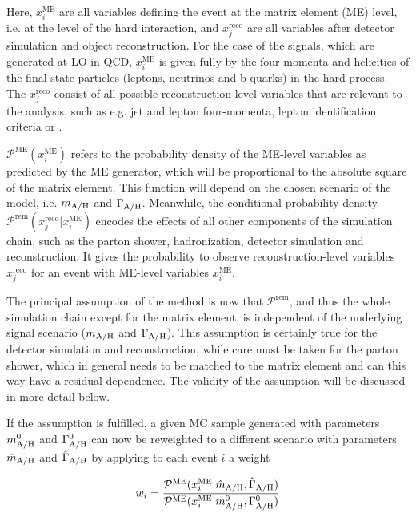 Here, $x_i^{\mathrm{ME}}$ are all variables defining the event at the matrix element (ME) level, i.e. at the level of the hard interaction, and $x_j^{\mathrm{reco}}$ are all variables after detector simulation and object reconstruction. For the case of the \AH signals, which are generated at LO in QCD, $x_i^{\mathrm{ME}}$ is given fully by the four-momenta and helicities of the final-state particles (leptons, neutrinos and b quarks) in the hard process. The $x_j^{\mathrm{reco}}$ consist of all possible reconstruction-level variables that are relevant to the analysis, such as e.g. jet and lepton four-momenta, lepton identification criteria or \ptmissvec. 

$\mathcal{P}^{\mathrm{ME}} (x_i^{\mathrm{ME}})$ refers to the probability density of the ME-level variables as predicted by the ME generator, which will be proportional to the absolute square of the matrix element. This function will depend on the chosen scenario of the \AH model, i.e. $m_{\mathrm{A/H}}$ and $\Gamma_{\mathrm{A/H}}$. Meanwhile, the conditional probability density $\mathcal{P}^{\mathrm{rem}} (x_j^{\mathrm{reco}} | x_i^{\mathrm{ME}})$ encodes the effects of all other components of the simulation chain, such as the parton shower, hadronization, detector simulation and reconstruction. It gives the probability to observe reconstruction-level variables $x_j^{\mathrm{reco}}$ for an event with ME-level variables $x_i^{\mathrm{ME}}$.

The principal assumption of the method is now that $\mathcal{P}^{\mathrm{rem}}$, and thus the whole simulation chain except for the matrix element, is independent of the underlying \AH signal scenario ($m_{\mathrm{A/H}}$ and $\Gamma_{\mathrm{A/H}}$). This assumption is certainly true for the detector simulation and reconstruction, while care must be taken for the parton shower, which in general needs to be matched to the matrix element and can this way have a residual dependence. The validity of the assumption will be discussed in more detail below.

If the assumption is fulfilled, a given \AH MC sample generated with parameters $m_{\mathrm{A/H}}^0$ and $\Gamma_{\mathrm{A/H}}^0$ can now be reweighted to a different \AH scenario with parameters $\hat{m}_{\mathrm{A/H}}$ and $\hat{\Gamma}_{\mathrm{A/H}}$ by applying to each event $i$ a weight 

\begin{equation}
\label{eq:ah:merewweight}
    w_i = \frac{ \mathcal{P}^{\mathrm{ME}} (x_i^{\mathrm{ME}} | \hat{m}_{\mathrm{A/H}} , \hat{\Gamma}_{\mathrm{A/H}} ) } { \mathcal{P}^{\mathrm{ME}} (x_i^{\mathrm{ME}} | m_{\mathrm{A/H}}^0 , \Gamma_{\mathrm{A/H}}^0 ) }
\end{equation}

